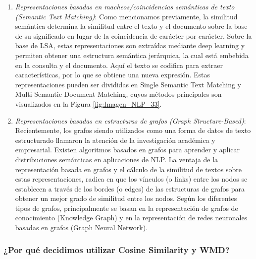 \documentclass[12pt,a4paper]{article}
\begin{document}
\begin{sloppypar}
\begin{enumerate}
\item \textit{Representaciones basadas en macheos/coincidencias semánticas de texto (Semantic Text Matching)}: Como mencionamos previamente, la similitud semántica determina la similitud entre el texto y el documento sobre la base de su significado en lugar de la coincidencia de carácter por carácter. Sobre la base de LSA, estas representaciones son extraídas mediante deep learning y permiten obtener una estructura semántica jerárquica, la cual está embebida en la consulta y el documento. Aquí el texto se codifica para extraer características, por lo que se obtiene una nueva expresión. Estas representaciones pueden ser divididas en Single Semantic Text Matching y Multi-Semantic Document Matching, cuyos métodos principales son visualizados en la Figura \ref{fig:Imagen_NLP_33}.

\item \textit{Representaciones basadas en estructuras de grafos (Graph Structure-Based)}: Recientemente, los grafos siendo utilizados como una forma de datos de texto estructurado llamaron la atención de la investigación académica y empresarial. Existen algoritmos basados en grafos para aprender y aplicar distribuciones semánticas en aplicaciones de NLP. La ventaja de la representación basada en grafos y el cálculo de la similitud de textos sobre estas representaciones, radica en que los vínculos (o links) entre los nodos se establecen a través de los bordes (o edges) de las estructuras de grafos para obtener un mejor grado de similitud entre los nodos. Según los diferentes tipos de grafos, principalmente se basan en la representación de grafos de conocimiento (Knowledge Graph) y en la representación de redes neuronales basadas en grafos (Graph Neural Network).
\\
\end{enumerate}

\subsubsection{¿Por qué decidimos utilizar Cosine Similarity y WMD?}\label{cos_y_wmd}


\end{sloppypar}
\end{document}
